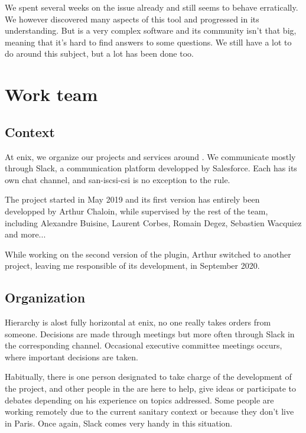 We spent several weeks on the issue already and  still seems to behave erratically. We however discovered many aspects of this tool and progressed in its understanding. But  is a very complex software and its community isn't that big, meaning that it's hard to find answers to some questions. We still have a lot to do around this subject, but a lot has been done too.

\section{Work team}

\subsection{Context}

At \gls{enix}, we organize our projects and services around . We communicate mostly through Slack, a communication platform developped by Salesforce. Each  has its own chat channel, and \gls{san-iscsi-csi} is no exception to the rule.

The project started in May 2019 and its first version has entirely been developped by Arthur Chaloin, while supervised by the rest of the team, including Alexandre Buisine, Laurent Corbes, Romain Degez, Sebastien Wacquiez and more...

While working on the second version of the plugin, Arthur switched to another project, leaving me responsible of its development, in September 2020.

\subsection{Organization}

Hierarchy is alost fully horizontal at \gls{enix}, no one really takes orders from someone. Decisions are made through meetings but more often through Slack in the corresponding  channel. Occasional executive committee meetings occurs, where important decisions are taken.

Habitually, there is one person designated to take charge of the development of the project, and other people in the  are here to help, give ideas or participate to debates depending on his experience on topics addressed. Some people are working remotely due to the current sanitary context or because they don't live in Paris. Once again, Slack comes very handy in this situation.

\clearpage
